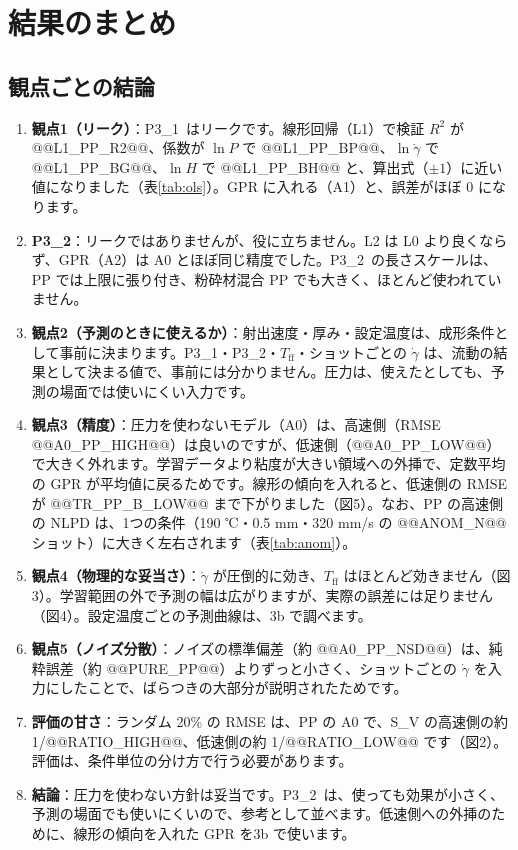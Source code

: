 \documentclass[paper=a4paper,fontsize=10.5pt,line_length=44zw,number_of_lines=38]{jlreq}
\newcommand{\gd}{\dot{\gamma}}
\newcommand{\PI}{P3\_1}
\newcommand{\PII}{P3\_2}
\newcommand{\Tff}{T_{\mathrm{ff}}}
\begin{document}
\section{結果のまとめ}

\subsection{観点ごとの結論}
\begin{enumerate}[itemsep=0.6ex,topsep=0.6ex]
\item \textbf{観点1（リーク）}：\PI\ はリークです。線形回帰（L1）で検証 $R^2$ が @@L1_PP_R2@@、係数が $\ln P$ で @@L1_PP_BP@@、$\ln\gd$ で @@L1_PP_BG@@、$\ln H$ で @@L1_PP_BH@@ と、算出式（$\pm 1$）に近い値になりました（表\ref{tab:ols}）。GPR に入れる（A1）と、誤差がほぼ 0 になります。
\item \textbf{\PII}：リークではありませんが、役に立ちません。L2 は L0 より良くならず、GPR（A2）は A0 とほぼ同じ精度でした。\PII\ の長さスケールは、PP では上限に張り付き、粉砕材混合 PP でも大きく、ほとんど使われていません。
\item \textbf{観点2（予測のときに使えるか）}：射出速度・厚み・設定温度は、成形条件として事前に決まります。\PI・\PII・$\Tff$・ショットごとの $\gd$ は、流動の結果として決まる値で、事前には分かりません。圧力は、使えたとしても、予測の場面では使いにくい入力です。
\item \textbf{観点3（精度）}：圧力を使わないモデル（A0）は、高速側（RMSE @@A0_PP_HIGH@@）は良いのですが、低速側（@@A0_PP_LOW@@）で大きく外れます。学習データより粘度が大きい領域への外挿で、定数平均の GPR が平均値に戻るためです。線形の傾向を入れると、低速側の RMSE が @@TR_PP_B_LOW@@ まで下がりました（図5）。なお、PP の高速側の NLPD は、1つの条件（190 ℃・0.5 mm・320 mm/s の @@ANOM_N@@ ショット）に大きく左右されます（表\ref{tab:anom}）。
\item \textbf{観点4（物理的な妥当さ）}：$\gd$ が圧倒的に効き、$\Tff$ はほとんど効きません（図3）。学習範囲の外で予測の幅は広がりますが、実際の誤差には足りません（図4）。設定温度ごとの予測曲線は、3b で調べます。
\item \textbf{観点5（ノイズ分散）}：ノイズの標準偏差（約 @@A0_PP_NSD@@）は、純粋誤差（約 @@PURE_PP@@）よりずっと小さく、ショットごとの $\gd$ を入力にしたことで、ばらつきの大部分が説明されたためです。
\item \textbf{評価の甘さ}：ランダム 20\% の RMSE は、PP の A0 で、S\_V の高速側の約 1/@@RATIO_HIGH@@、低速側の約 1/@@RATIO_LOW@@ です（図2）。評価は、条件単位の分け方で行う必要があります。
\item \textbf{結論}：圧力を使わない方針は妥当です。\PII\ は、使っても効果が小さく、予測の場面でも使いにくいので、参考として並べます。低速側への外挿のために、線形の傾向を入れた GPR を3b で使います。
\end{enumerate}
\end{document}
